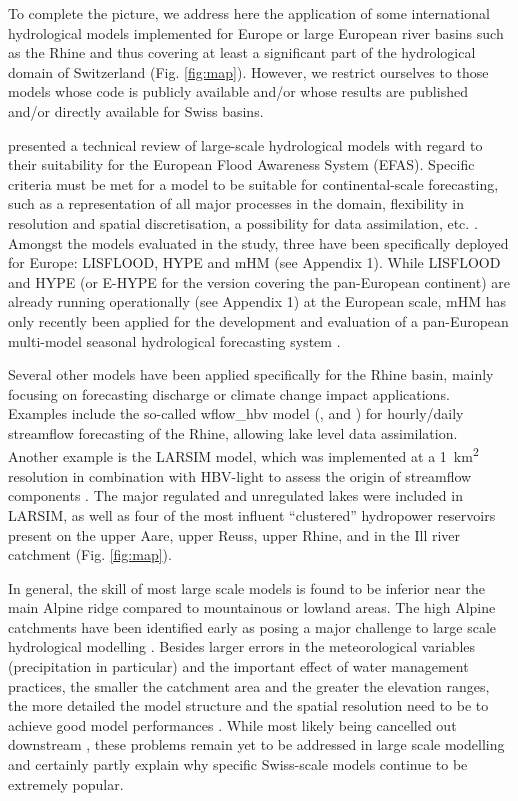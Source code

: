 \documentclass[10pt,a4paper]{article}
\begin{document}
To complete the picture, we address here the application of some international hydrological models implemented for Europe or large European river basins such as the Rhine and thus covering at least a significant part of the hydrological domain of Switzerland (Fig. \ref{fig:map}). However, we restrict ourselves to those models whose code is publicly available and/or whose results are published and/or directly available for Swiss basins.

\citet{Kauffeldt2016} presented a technical review of large-scale hydrological models with regard to their suitability for the European Flood Awareness System (EFAS). Specific criteria must be met for a model to be suitable for continental-scale forecasting, such as a representation of all major processes in the domain, flexibility in resolution and spatial discretisation, a possibility for data assimilation, etc. \citep{Kauffeldt2016}. Amongst the models evaluated in the study, three have been specifically deployed for Europe: LISFLOOD, HYPE and mHM (see Appendix 1). While LISFLOOD and HYPE (or E-HYPE for the version covering the pan-European continent) are already running operationally (see Appendix 1) at the European scale, mHM has only recently been applied for the development and evaluation of a pan-European multi-model seasonal hydrological forecasting system \citep{Wanders2019}.

Several other models have been applied specifically for the Rhine basin, mainly focusing on forecasting discharge or climate change impact applications. Examples include the so-called wflow\_hbv model (\citealp{vanOsnabrugge2017}, \citealp{vanOsnabrugge2019} and \citealt{vanOsnabrugge2020}) for hourly/daily streamflow forecasting of the Rhine, allowing lake level data assimilation. Another example is the LARSIM model, which was implemented at a 1~km\textsuperscript{2} resolution in combination with HBV-light to assess the origin of streamflow components \citep{Stahl2017}. The major regulated and unregulated lakes were included in LARSIM, as well as four of the most influent ``clustered'' hydropower reservoirs present on the upper Aare, upper Reuss, upper Rhine, and in the Ill river catchment (Fig. \ref{fig:map}).

In general, the skill of most large scale models is found to be inferior near the main Alpine ridge compared to mountainous or lowland areas. The high Alpine catchments have been identified early as posing a major challenge to large scale hydrological modelling \citep{Kleinn2005}.  Besides larger errors in the meteorological variables (precipitation in particular) and the important effect of water management practices, the smaller the catchment area and the greater the elevation ranges, the more detailed the model structure and the spatial resolution need to be to achieve good model performances \citep{Gurtz2003}. While most likely being cancelled out downstream \citep{Kleinn2005}, these problems remain yet to be addressed in large scale modelling and certainly partly explain why specific Swiss-scale models continue to be extremely popular. 
\end{document}
